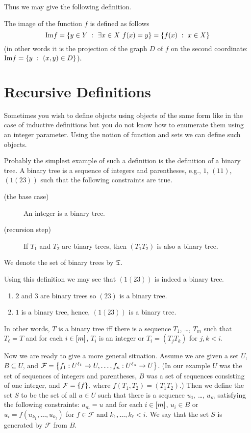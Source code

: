 Thus we may give the following definition.
\begin{definition}
    The image of the function $f$ is defined as follows
    \[
        \Im f = \set[\exists x \in X\ f(x) = y]{y \in Y}
        = \set[x \in X]{f(x)}
    \]
    (in other words it is the projection of the graph $D$ of $f$ on the second
    coordinate: $\Im f = \set[(x, y) \in D]{y}$).
\end{definition}

\section{Recursive Definitions}
Sometimes you wish to define objects using objects of the same form like in the
case of inductive definitions but you do not know how to enumerate them using
an integer parameter. Using the notion of function and sets we can define such
objects.


Probably the simplest example of such a definition is the definition of a
binary tree. A binary tree is a sequence of integers and parentheses, e.g.,
$1$, $(1 1)$, $(1 (2 3))$ such that the following constraints are true.
\begin{description}
    \item [(the base case)] An integer is a binary tree.
    \item[(recursion step)] If $T_1$ and $T_2$ are binary trees, then
        $(T_1 T_2)$ is also a binary tree.
\end{description}
We denote the set of binary trees by $\mathfrak{T}$.

Using this definition we may see that $(1 (2 3))$ is indeed a binary tree.
\begin{enumerate}
    \item $2$ and $3$ are binary trees so $(2 3)$ is a binary tree.
    \item $1$ is a binary tree, hence, $(1 (2 3))$ is a binary tree.
\end{enumerate}

In other words, $T$ is a binary tree iff there is a sequence
$T_1$, \dots, $T_m$ such that $T_\ell = T$ and for each $i \in [{m}]$,
$T_i$ is an integer or $T_i = (T_j T_k)$ for $j, k < i$.

Now we are ready to give a more general situation. Assume we are given a set
$U$, $B \subseteq U$, and
$\mathcal{F} = \set{f_1 : U^{\ell_1} \to U, \dots, f_n : U^{\ell_n} \to U}$.
(In our example $U$ was the set of sequences of integers and parentheses,
$B$ was a set of sequences consisting of one integer, and
$\mathcal{F} = \set{f}$, where $f(T_1, T_2) = (T_1 T_2)$.) Then we define the
set $S$ to be the set of all $u \in U$ such that there is a sequence
$u_1$, \dots, $u_m$ satisfying the following constraints: $u_m = u$ and
for each $i \in [{m}]$, $u_i \in B$ or $u_i = f(u_{k_1}, \dots, u_{k_\ell})$
for $f \in \mathcal{F}$ and $k_1, \dots, k_\ell < i$. We say that the set $S$
is generated by $\mathcal{F}$ from $B$.

